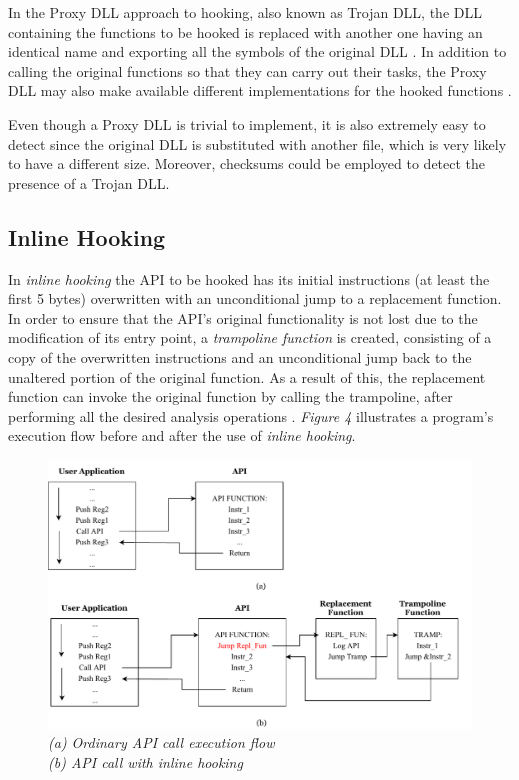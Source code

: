 In the Proxy DLL approach to hooking, also known as Trojan DLL, the DLL containing the functions to be hooked is replaced with another one having an identical name and exporting all the symbols of the original DLL \cite{CodeProjectHooking}. In addition to calling the original functions so that they can carry out their tasks, the Proxy DLL may also make available different implementations for the hooked functions \cite{Berdajs:2010:EAU:1815744.1815746}.

Even though a Proxy DLL is trivial to implement, it is also extremely easy to detect since the original DLL is substituted with another file, which is very likely to have a different size. Moreover, checksums could be employed to detect the presence of a Trojan DLL.


\subsection{Inline Hooking}

In \textit{inline hooking} the API to be hooked has its initial instructions (at least the first 5 bytes) overwritten with an unconditional jump to a replacement function. In order to ensure that the API's original functionality is not lost due to the modification of its entry point, a \textit{trampoline function} is created, consisting of a copy of the overwritten instructions and an unconditional jump back to the unaltered portion of the original function. As a result of this, the replacement function can invoke the original function by calling the trampoline, after performing all the desired analysis operations \cite{Berdajs:2010:EAU:1815744.1815746}.
\textit{Figure 4} illustrates a program's execution flow before and after the use of \textit{inline hooking}.

\begin{figure}[h]
\centering
\includegraphics[scale=0.8]{Figures/Inline.pdf}
\caption{\textit{(a) Ordinary API call execution flow \\
				  (b) API call with inline hooking}}
\end{figure}

